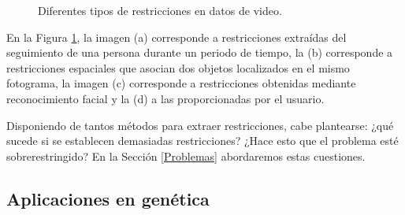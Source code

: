 \begin{figure}[bth]
	\myfloatalign
	\quad
	 \quad
	\quad
	\caption[Diferentes tipos de restricciones en datos de video.]{Diferentes tipos de restricciones en datos de video. \cite{Yan:2006} \cite{Survey:2007}}\label{fig:figure12}
\end{figure}

En la Figura \ref{fig:figure12}, la imagen (a) corresponde a restricciones extraídas del seguimiento de una persona durante un periodo de tiempo, la (b) corresponde a restricciones espaciales que asocian dos objetos localizados en el mismo fotograma, la imagen (c) corresponde a restricciones obtenidas mediante reconocimiento facial y la (d) a las proporcionadas por el usuario.

Disponiendo de tantos métodos para extraer restricciones, cabe plantearse: ¿qué sucede si se establecen demasiadas restricciones? ¿Hace esto que el problema esté sobrerestringido? En la Sección \ref{Problemas} abordaremos estas cuestiones.

\subsection{Aplicaciones en genética}

